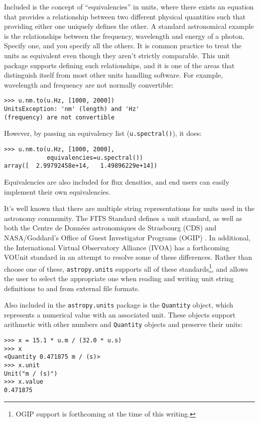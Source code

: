 \documentclass[traditabstract]{aa}
\begin{document}
Included is the concept of ``equivalencies'' in units, where there
exists an equation that provides a relationship between two different
physical quantities such that providing either one uniquely defines
the other.  A standard astronomical example is the relationships
between the frequency, wavelength and energy of a photon.  Specify
one, and you specify all the others. It is common practice to treat
the units as equivalent even though they aren't strictly comparable.
This unit package supports defining such relationships, and it is one
of the areas that distinguish itself from most other units handling
software.  For example, wavelength and frequency are not normally
convertible:
\begin{verbatim}
>>> u.nm.to(u.Hz, [1000, 2000])
UnitsException: 'nm' (length) and 'Hz'
(frequency) are not convertible
\end{verbatim}
However, by passing an equivalency list (\texttt{u.spectral()}), it
does:
\begin{verbatim}
>>> u.nm.to(u.Hz, [1000, 2000],
            equivalencies=u.spectral())
array([  2.99792458e+14,   1.49896229e+14])
\end{verbatim}
Equivalencies are also included for flux densities, and end users can
easily implement their own equivalencies.


It's well known that there are multiple string representations for
units used in the astronomy community.  The FITS Standard
\cite{fits2008} defines a unit standard, as well as both the Centre de
Donn\'ees astronomiques de Strasbourg (CDS) \citep{ochsenbein2000cds}
and NASA/Goddard's Office of Guest Investigator Programs (OGIP)
\citep{george1995ogip}.  In additional, the International Virtual
Observatory Alliance (IVOA) has a forthcoming VOUnit standard
\citep{derriere2012vounit} in an attempt to resolve some of these
differences.  Rather than choose one of these, \texttt{astropy.units}
supports all of these standards\footnote{OGIP support is forthcoming
  at the time of this writing.}, and allows the user to select the
appropriate one when reading and writing unit string definitions to
and from external file formats.

Also included in the \texttt{astropy.units} package is the
\texttt{Quantity} object, which represents a numerical value with an
associated unit.  These objects support arithmetic with other numbers
and \texttt{Quantity} objects and preserve their units:
\begin{verbatim}
>>> x = 15.1 * u.m / (32.0 * u.s)
>>> x
<Quantity 0.471875 m / (s)>
>>> x.unit
Unit("m / (s)")
>>> x.value
0.471875
\end{verbatim}
\end{document}
